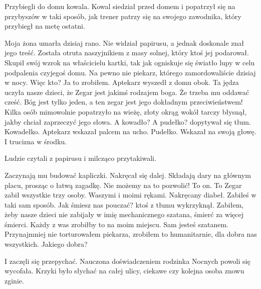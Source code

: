 Przybiegli do domu kowala.
Kowal siedział przed domem i popatrzył się na przybyszów w taki sposób, jak trener patrzy się na swojego zawodnika, który przybiegł na metę ostatni.
\begin{dialogue}
	\ds{} Moja żona umarła dzisiaj rano. \dm{} 
		Nie widział papirusu, a jednak doskonale znał jego treść. \dm{} 
		Została otruta naszyjnikiem z masy solnej, który ktoś jej podarował. \dm{}
		Skupił swój wzrok na właścicielu kartki, tak jak ogniskuje się światło lupy w celu podpalenia czyjegoś domu. \dm{} 
		Na pewno nie piekarz, którego zamordowaliście dzisiaj w nocy. Więc kto?
	\ds{} Ja to zrobiłem. \dm{} 
		Aptekarz wyszedł z domu obok. \dm{} 
		Ta jędza uczyła nasze dzieci, że Zegar jest jakimś rodzajem boga. Że trzeba mu oddawać cześć. Bóg jest tylko jeden, a ten zegar jest jego dokładnym przeciwieństwem! \dm{} 
		Kilka osób mimowolnie popatrzyło na wieżę, złoty okrąg wokół tarczy błysnął, jakby chciał zaprzeczyć jego słowa.
	\ds{} A kowadło? A pudełko? \dm{} 
		dopytywał się tłum.
	\ds{} Kowadełko. \dm{} Aptekarz wskazał palcem na ucho. \dm{} Pudełko. \dm{} Wskazał na swoją głowę. \dm{} I trucizna w środku.
\end{dialogue}
Ludzie czytali z papirusu i milcząco przytakiwali.
\begin{dialogue}
	\ds{} Zaczynają mu budować kapliczki. \dm{} 
		Nakręcał się dalej. \dm{}
		Składają dary na głównym placu, prosząc o łatwą zagadkę. Nie możemy na to pozwolić! To on. To Zegar zabił wszystkie trzy osoby. Waszymi i moimi rękami. Nakręcany diabeł.
	\ds{} Zabiłeś w taki sam sposób. Jak śmiesz nas pouczać? \dm{} 
		ktoś z tłumu wykrzyknął.
	\ds{} Zabiłem, żeby nasze dzieci nie zabijały w imię mechanicznego szatana, śmierć za więcej śmierci. Każdy z was zrobiłby to na moim miejscu.
	\ds{} Sam jesteś szatanem. 
	\ds{} Przynajmniej nie torturowałem piekarza, zrobiłem to humanitarnie, dla dobra nas wszystkich.
	\ds{} Jakiego dobra?
\end{dialogue}
I zaczęli się przepychać.
Nauczona doświadczeniem rodzinka Nocnych powoli się wycofała.
Krzyki było słychać na całej ulicy, ciekawe czy kolejna osoba znowu zginie.

